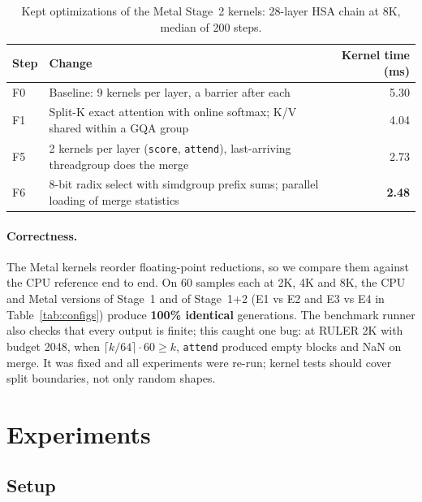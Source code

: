 \documentclass[10pt,letterpaper]{article}
\newcommand{\code}[1]{\texttt{#1}}
\newcommand{\best}[1]{\textbf{#1}}
\begin{document}
\begin{table}[h]
\centering\small
\caption{Kept optimizations of the Metal Stage~2 kernels: 28-layer HSA chain at 8K, median of 200 steps.}
\label{tab:opt}
\begin{tabular}{llr}
\toprule
Step & Change & Kernel time (ms) \\
\midrule
F0 & Baseline: 9 kernels per layer, a barrier after each & 5.30 \\
F1 & Split-K exact attention with online softmax; K/V shared within a GQA group & 4.04 \\
F5 & 2 kernels per layer (\code{score}, \code{attend}), last-arriving threadgroup does the merge & 2.73 \\
F6 & 8-bit radix select with simdgroup prefix sums; parallel loading of merge statistics & \best{2.48} \\
\bottomrule
\end{tabular}
\end{table}

\paragraph{Correctness.}
The Metal kernels reorder floating-point reductions, so we compare them against the CPU reference end to end. On 60 samples each at 2K, 4K and 8K, the CPU and Metal versions of Stage~1 and of Stage~1+2 (E1 vs E2 and E3 vs E4 in Table~\ref{tab:configs}) produce \textbf{100\% identical} generations. The benchmark runner also checks that every output is finite; this caught one bug: at RULER 2K with budget 2048, when $\lceil k/64\rceil \cdot 60 \ge k$, \code{attend} produced empty blocks and NaN on merge. It was fixed and all experiments were re-run; kernel tests should cover split boundaries, not only random shapes.

\section{Experiments}

\subsection{Setup}
\end{document}
